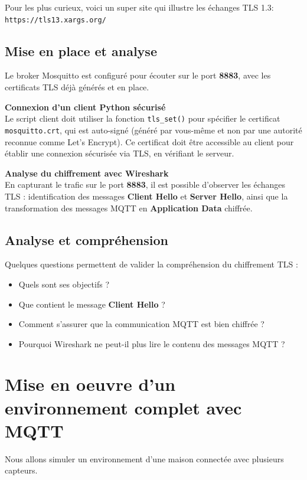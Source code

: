 \documentclass{article}
\begin{document}
Pour les plus curieux, voici un super site qui illustre les échanges TLS 1.3: \texttt{https://tls13.xargs.org/}

\subsection{Mise en place et analyse}

Le broker Mosquitto est configuré pour écouter sur le port \textbf{8883}, avec les certificats TLS déjà générés et en place.

\bigskip
\noindent
\textbf{Connexion d'un client Python sécurisé} \\
Le script client doit utiliser la fonction \texttt{tls\_set()} pour spécifier le certificat \texttt{mosquitto.crt}, qui est auto-signé (généré par vous-même et non par une autorité reconnue comme Let's Encrypt). Ce certificat doit être accessible au client pour établir une connexion sécurisée via TLS, en vérifiant le serveur.

\bigskip
\noindent
\textbf{Analyse du chiffrement avec Wireshark} \\
En capturant le trafic sur le port \textbf{8883}, il est possible d'observer les échanges TLS : identification des messages \textbf{Client Hello} et \textbf{Server Hello}, ainsi que la transformation des messages MQTT en \textbf{Application Data} chiffrée.

\subsection{Analyse et compréhension}

Quelques questions permettent de valider la compréhension du chiffrement TLS : \begin{itemize} \item Quels sont ses objectifs ? \item Que contient le message \textbf{Client Hello} ? \item Comment s’assurer que la communication MQTT est bien chiffrée ? \item Pourquoi Wireshark ne peut-il plus lire le contenu des messages MQTT ? \end{itemize}

\section{Mise en oeuvre d'un environnement complet avec MQTT}

Nous allons simuler un environnement d'une maison connectée avec plusieurs capteurs.
\end{document}
